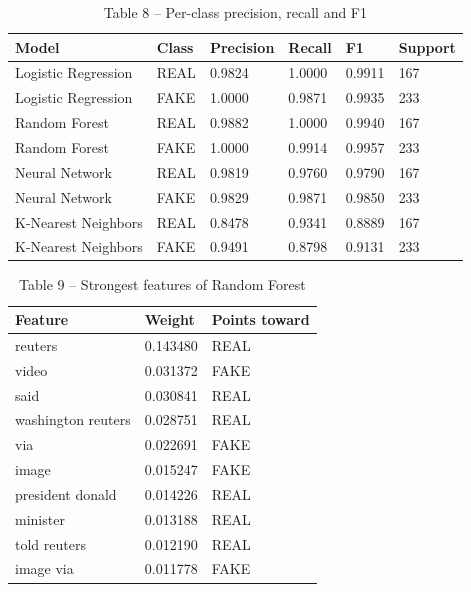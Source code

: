 \documentclass[conference,a4paper]{IEEEtran}
\begin{document}
\begin{table}[!t]
  \centering
  \footnotesize
  \caption{Table 8 -- Per-class precision, recall and F1}
  \label{tab:table8perclassprecisionrecal}
  \begin{tabular}{llllll}
    \toprule
    Model & Class & Precision & Recall & F1 & Support \\
    \midrule
    Logistic Regression & REAL & 0.9824 & 1.0000 & 0.9911 & 167 \\
    Logistic Regression & FAKE & 1.0000 & 0.9871 & 0.9935 & 233 \\
    Random Forest & REAL & 0.9882 & 1.0000 & 0.9940 & 167 \\
    Random Forest & FAKE & 1.0000 & 0.9914 & 0.9957 & 233 \\
    Neural Network & REAL & 0.9819 & 0.9760 & 0.9790 & 167 \\
    Neural Network & FAKE & 0.9829 & 0.9871 & 0.9850 & 233 \\
    K-Nearest Neighbors & REAL & 0.8478 & 0.9341 & 0.8889 & 167 \\
    K-Nearest Neighbors & FAKE & 0.9491 & 0.8798 & 0.9131 & 233 \\
    \bottomrule
  \end{tabular}
\end{table}

\begin{table}[!t]
  \centering
  \small
  \caption{Table 9 -- Strongest features of Random Forest}
  \label{tab:table9strongestfeaturesofran}
  \begin{tabular}{lll}
    \toprule
    Feature & Weight & Points toward \\
    \midrule
    reuters & 0.143480 & REAL \\
    video & 0.031372 & FAKE \\
    said & 0.030841 & REAL \\
    washington reuters & 0.028751 & REAL \\
    via & 0.022691 & FAKE \\
    image & 0.015247 & FAKE \\
    president donald & 0.014226 & REAL \\
    minister & 0.013188 & REAL \\
    told reuters & 0.012190 & REAL \\
    image via & 0.011778 & FAKE \\
    \bottomrule
  \end{tabular}
\end{table}
\end{document}
